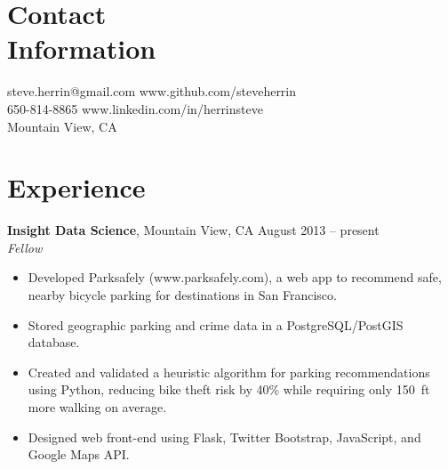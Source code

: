 \documentclass[margin,line]{resume}
\begin{document}
\begin{resume}

    \section{\mysidestyle Contact\\Information}

    steve.herrin@gmail.com		\hfill www.github.com/steveherrin		\vspace{0mm}\\\vspace{0mm}%
    650-814-8865				\hfill www.linkedin.com/in/herrinsteve	\vspace{0mm}\\\vspace{-4.5mm}%
    Mountain View, CA			\hfill								\vspace{0mm}\\\vspace{0mm}%
    
    \section{\mysidestyle Experience}
    
    \textbf{Insight Data Science}, Mountain View, CA \hfill August 2013 -- present\vspace{1mm}\\\vspace{1mm}%
    \textsl{Fellow}
    \begin{itemize}
    \item Developed Parksafely (www.parksafely.com), a web app to recommend safe, nearby bicycle parking for destinations in San Francisco.
    \item Stored geographic parking and crime data in a PostgreSQL/PostGIS database.
    \item Created and validated a heuristic algorithm for parking recommendations using Python, reducing bike theft risk by 40\% while requiring only 150~ft more walking on average.
    \item Designed web front-end using Flask, Twitter Bootstrap, JavaScript, and Google Maps API.
    \end{itemize}


\end{resume}
\end{document}
